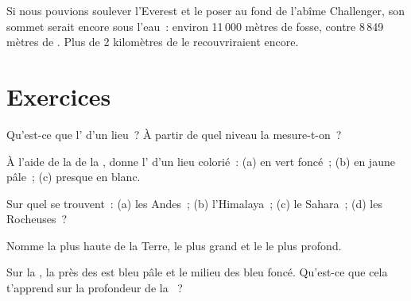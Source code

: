 \begin{example}\label{ex:g4:world-physical-map:everest-in-deep}
Si nous pouvions soulever l'Everest et le poser au fond de l'abîme
Challenger, son sommet serait encore sous l'eau~: environ 11\,000 mètres de
fosse, contre 8\,849 mètres de . Plus de 2 kilomètres de  le
recouvriraient encore.
\end{example}

\section{Exercices}

\begin{exercise}[$\star$]\label{exo:g4:world-physical-map:1}
Qu'est-ce que l' d'un lieu~? À partir de quel niveau la mesure-t-on~?
\end{exercise}

\begin{exercise}[$\star$]\label{exo:g4:world-physical-map:2}
À l'aide de la  de la , donne l' d'un lieu
colorié~: (a) en vert foncé~; (b) en jaune pâle~; (c) presque en blanc.
\end{exercise}

\begin{exercise}[$\star$]\label{exo:g4:world-physical-map:3}
Sur quel  se trouvent~: (a) les Andes~; (b) l'Himalaya~; (c) le
Sahara~; (d) les Rocheuses~?
\end{exercise}

\begin{exercise}[$\star$]\label{exo:g4:world-physical-map:4}
Nomme la plus haute  de la Terre, le plus grand  et le  le plus profond.
\end{exercise}

\begin{exercise}[$\star$]\label{exo:g4:world-physical-map:5}
Sur la , la  près des  est bleu pâle et le milieu des
 bleu foncé. Qu'est-ce que cela t'apprend sur la profondeur de la ~?
\end{exercise}

